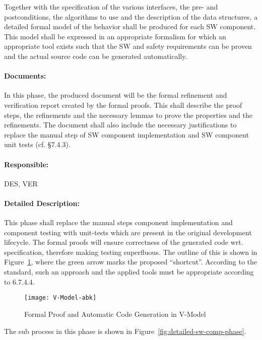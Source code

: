 Together with the specification of the various interfaces, the pre- and
postconditions, the algorithms to use and the description of the data
structures, a detailed formal model of the behavior shall be produced for each
SW component. This model shall be expressed in an appropriate formalism for
which an appropriate tool exists such that the SW and safety requirements can be
proven and the actual source code can be generated automatically.

\paragraph{Documents:}
\label{sec:sw-comp-documents}
In this phase, the produced document will be the formal refinement and
verification report created by the formal proofs. This shall describe the proof
steps, the refinements and the necessary lemmas to prove the properties and the
refinements. The document shall also include the necessary justifications to
replace the manual step of SW component implementation and SW component unit
tests (cf. §7.4.3).

\paragraph{Responsible:}
\label{sec:sw-comp-responsible}
DES, VER

\paragraph{Detailed Description:}
\label{sec:sw-comp-deta-descr}
This phase shall replace the manual steps component implementation and component
testing with unit-tests which are present in the original development
lifecycle. The formal proofs will ensure correctness of the generated code
wrt. specification, therefore making testing superfluous. The outline of this is
shown in Figure~\ref{fig:proof-code-generation}, where the green arrow marks the
proposed ``shortcut''. According to the standard, such an approach and the
applied tools must be appropriate according to 6.7.4.4.

\begin{figure}[ht]
  \centering
  \texttt{[image: V-Model-abk]}
  \caption{Formal Proof and Automatic Code Generation in V-Model}
  \label{fig:proof-code-generation}
\end{figure}

The sub process in this phase is shown in
Figure~\ref{fig:detailed-sw-comp-phase}.


